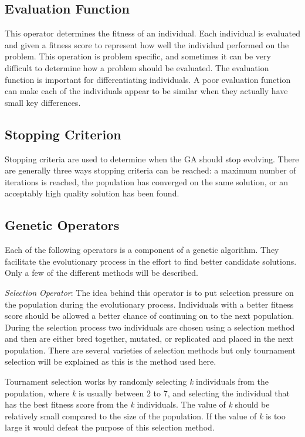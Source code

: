 \subsection{Evaluation Function}
\label{subsec:fitness-function}

This operator determines the fitness of an individual. Each individual is evaluated and given a fitness score to represent how well the individual performed on the problem. This operation is problem specific, and sometimes it can be very difficult to determine how a problem should be evaluated. The evaluation function is important for differentiating individuals. A poor evaluation function can make each of the individuals appear to be similar when they actually have small key differences. 

\subsection{Stopping Criterion}

Stopping criteria are used to determine when the GA should stop evolving. There are generally three ways stopping criteria can be reached: a maximum number of iterations is reached, the population has converged on the same solution, or an acceptably high quality solution has been found.

\subsection{Genetic Operators}
\label{subsec:ga-operators}

Each of the following operators is a component of a genetic algorithm. They facilitate the evolutionary process in the effort to find better candidate solutions. Only a few of the different methods will be described.

\textit{Selection Operator}: The idea behind this operator is to put selection pressure on the population during the evolutionary process. Individuals with a better fitness score should be allowed a better chance of continuing on to the next population. During the selection process two individuals are chosen using a selection method and then are either bred together, mutated, or replicated and placed in the next population. There are several varieties of selection methods but only tournament selection will be explained as this is the method used here.

Tournament selection works by randomly selecting \textit{k} individuals from the population, where \textit{k} is usually between 2 to 7, and selecting the individual that has the best fitness score from the \textit{k} individuals. The value of \textit{k} should be relatively small compared to the size of the population. If the value of \textit{k} is too large it would defeat the purpose of this selection method.

